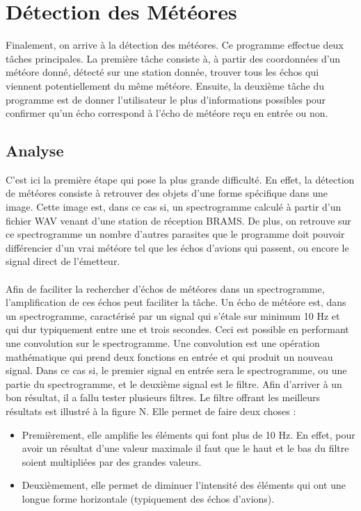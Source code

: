 \documentclass[11pt]{article}
\begin{document}
\newpage

\section{Détection des Météores}

Finalement, on arrive à la détection des météores.
Ce programme effectue deux tâches principales.
La première tâche consiste à, à partir des coordonnées d'un météore donné, détecté sur une station donnée, trouver tous les échos qui viennent potentiellement du même météore.
Ensuite, la deuxième tâche du programme est de donner l'utilisateur le plus d'informations possibles pour confirmer qu'un écho correspond à l'écho de météore reçu en entrée ou non.

\subsection{Analyse}

C'est ici la première étape qui pose la plus grande difficulté.
En effet, la détection de météores consiste à retrouver des objets d'une forme spécifique dans une image.
Cette image est, dans ce cas si, un spectrogramme calculé à partir d'un fichier WAV venant d'une station de réception BRAMS.
De plus, on retrouve sur ce spectrogramme un nombre d'autres parasites que le programme doit pouvoir différencier d'un vrai météore tel que les échos d'avions qui passent, ou encore le signal direct de l'émetteur.\\
\\
Afin de faciliter la rechercher d'échos de météores dans un spectrogramme, l'amplification de ces échos peut faciliter la tâche.
Un écho de météore est, dans un spectrogramme, caractérisé par un signal qui s'étale sur minimum 10 Hz et qui dur typiquement entre une et trois secondes.
Ceci est possible en performant une convolution sur le spectrogramme.
Une convolution est une opération mathématique qui prend deux fonctions en entrée et qui produit un nouveau signal.
Dans ce cas si, le premier signal en entrée sera le spectrogramme, ou une partie du spectrogramme, et le deuxième signal est le filtre.
Afin d'arriver à un bon résultat, il a fallu tester plusieurs filtres.
Le filtre offrant les meilleurs résultats est illustré à la figure N.
Elle permet de faire deux choses :

\begin{itemize}
    \item Premièrement, elle amplifie les éléments qui font plus de 10 Hz.
          En effet, pour avoir un résultat d'une valeur maximale il faut que le haut et le bas du filtre soient multipliées par des grandes valeurs.
    \item Deuxièmement, elle permet de diminuer l'intensité des éléments qui ont une longue forme horizontale (typiquement des échos d'avions).
\end{itemize}
\end{document}
